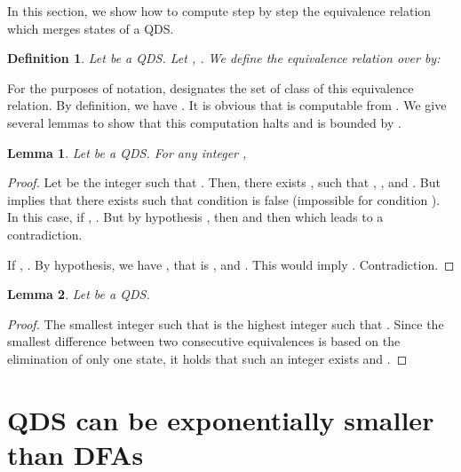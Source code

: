 \documentclass[11pt]{elsarticle}
\newtheorem{definition}{Definition}
\newtheorem{lemma}{Lemma}
\begin{document}
In this section, we show how to compute step by step the equivalence relation   which merges states of  a QDS.

\begin{definition}\label{def equiv}
  Let  be a QDS. Let , . We define  the equivalence relation  over   by:
  
    
    
  
  


\end{definition}



For the purposes of notation,  designates the set of  class of this equivalence relation. By definition, we have . It is obvious that  is computable from . We give several lemmas to show that this computation halts and is bounded by . 


\begin{lemma}
Let   be a QDS.  For any integer , 
   \end{lemma}
   \begin{proof}
Let  be the integer such that .
Then, there exists ,   such that , , and .
But  implies that there exists  such that condition  is false (impossible for condition ).
In this case,
if , . But by hypothesis , then
 and then  which leads to a contradiction.

If , .
By hypothesis, we have , that is , and
. This would imply . Contradiction.
   \end{proof}


\begin{lemma}
Let   be a QDS.   
   \end{lemma}
   \begin{proof}

 
 The smallest integer  such that  is the highest integer such that . Since the smallest difference between two consecutive equivalences is based on the elimination of only one state, it holds that such an integer  exists and .
  
\end{proof}











\section{QDS can be exponentially smaller than DFAs}\label{sec qds vs dfa}
\end{document}
